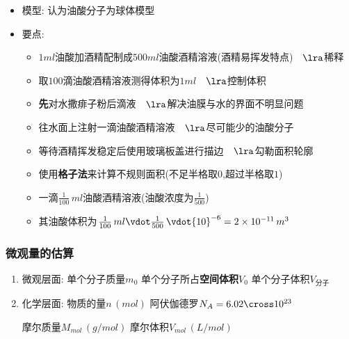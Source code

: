 \documentclass{article}
\begin{document}
\begin{enumerate}
\begin{itemize}
                    \hspace{2.7em}此滴油酸体积可求$V = S \vdot d $,测量面积$S$即可计算厚度$d$
              \item 模型: 认为油酸分子为球体模型
              \item 要点:
                    \begin{itemize}
                        \item $1ml$油酸加酒精配制成$500ml$油酸酒精溶液(酒精易挥发特点)$\hspace{1em}\lra$稀释
                        \item 取$100$滴油酸酒精溶液测得体积为$1ml$$\hspace{1em}\lra$控制体积
                        \item \textbf{先}对水撒痱子粉后滴液$\hspace{1em}\lra$解决油膜与水的界面不明显问题
                        \item 往水面上注射一滴油酸酒精溶液$\hspace{1em}\lra$尽可能少的油酸分子
                        \item 等待酒精挥发稳定后使用玻璃板盖进行描边$\hspace{1em}\lra$勾勒面积轮廓
                        \item 使用\textbf{格子法}来计算不规则面积(不足半格取$0$,超过半格取$1$)
                        \item 一滴$\frac{1}{100} \, ml$油酸酒精溶液(油酸浓度为$\frac{1}{500}$)
                        \item []
                              其油酸体积为$\frac{1}{100} \, ml \vdot \frac{1}{500} \, \vdot {10}^{-6}= 2 \times 10 ^{-11} \, m^{3}$
                    \end{itemize}
          \end{itemize}

          \subsubsection{微观量的估算}
          \begin{enumerate}[label = (\arabic*{})]
              \item 微观层面: 单个分子质量$m_{0}$ \quad 单个分子所占\textbf{空间体积}$V_{0}$ \quad 单个分子体积$V_{\text{分子}}$
              \item 化学层面: 物质的量$n \, (mol)$ \quad 阿伏伽德罗$N_{A} = 6.02 \cross 10^{23}$

                    \hspace{4.8em}摩尔质量$M_{mol} \, (g \slash mol)$ \quad 摩尔体积$V_{mol} \, (L \slash mol)$


\end{enumerate}
\end{enumerate}
\end{document}
